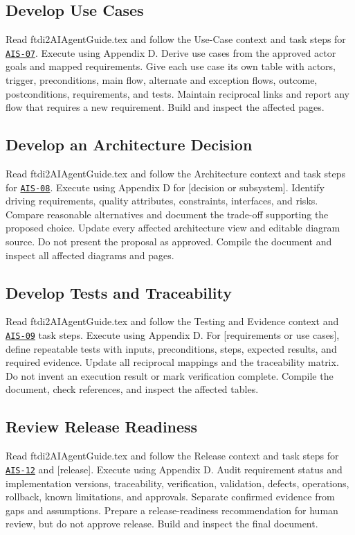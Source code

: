 \subsection{Develop Use Cases}
\begingroup\ttfamily\raggedright
\noindent Read ftdi2AIAgentGuide.tex and follow the Use-Case context and task steps for \hyperref[Skill:AIS-07]{\texttt{AIS-07}}. Execute using Appendix D. Derive use cases from the approved actor goals and mapped requirements. Give each use case its own table with actors, trigger, preconditions, main flow, alternate and exception flows, outcome, postconditions, requirements, and tests. Maintain reciprocal links and report any flow that requires a new requirement. Build and inspect the affected pages.\par
\endgroup


\subsection{Develop an Architecture Decision}
\begingroup\ttfamily\raggedright
\noindent Read ftdi2AIAgentGuide.tex and follow the Architecture context and task steps for \hyperref[Skill:AIS-08]{\texttt{AIS-08}}. Execute using Appendix D for [decision or subsystem]. Identify driving requirements, quality attributes, constraints, interfaces, and risks. Compare reasonable alternatives and document the trade-off supporting the proposed choice. Update every affected architecture view and editable diagram source. Do not present the proposal as approved. Compile the document and inspect all affected diagrams and pages.\par
\endgroup


\subsection{Develop Tests and Traceability}
\begingroup\ttfamily\raggedright
\noindent Read ftdi2AIAgentGuide.tex and follow the Testing and Evidence context and \hyperref[Skill:AIS-09]{\texttt{AIS-09}} task steps. Execute using Appendix D. For [requirements or use cases], define repeatable tests with inputs, preconditions, steps, expected results, and required evidence. Update all reciprocal mappings and the traceability matrix. Do not invent an execution result or mark verification complete. Compile the document, check references, and inspect the affected tables.\par
\endgroup


\subsection{Review Release Readiness}
\begingroup\ttfamily\raggedright
\noindent Read ftdi2AIAgentGuide.tex and follow the Release context and task steps for \hyperref[Skill:AIS-12]{\texttt{AIS-12}} and [release]. Execute using Appendix D. Audit requirement status and implementation versions, traceability, verification, validation, defects, operations, rollback, known limitations, and approvals. Separate confirmed evidence from gaps and assumptions. Prepare a release-readiness recommendation for human review, but do not approve release. Build and inspect the final document.\par
\endgroup



